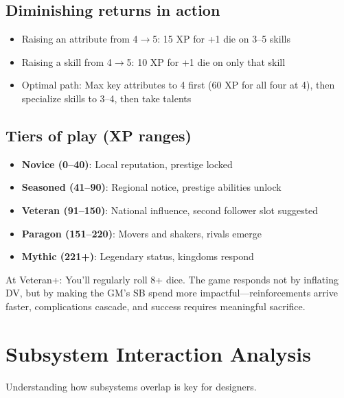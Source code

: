 \documentclass[11pt]{article}
\begin{document}
\subsection{Diminishing returns in action}
\begin{itemize}
    \item Raising an attribute from 4$\rightarrow$5: 15 XP for +1 die on 3--5 skills
    \item Raising a skill from 4$\rightarrow$5: 10 XP for +1 die on only that skill
    \item Optimal path: Max key attributes to 4 first (60 XP for all four at 4), then specialize skills to 3--4, then take talents
\end{itemize}

\subsection{Tiers of play (XP ranges)}
\begin{itemize}
    \item \textbf{Novice (0--40)}: Local reputation, prestige locked
    \item \textbf{Seasoned (41--90)}: Regional notice, prestige abilities unlock
    \item \textbf{Veteran (91--150)}: National influence, second follower slot suggested
    \item \textbf{Paragon (151--220)}: Movers and shakers, rivals emerge
    \item \textbf{Mythic (221+)}: Legendary status, kingdoms respond
\end{itemize}

At Veteran+: You'll regularly roll 8+ dice. The game responds not by inflating DV, but by making the GM's SB spend more impactful---reinforcements arrive faster, complications cascade, and success requires meaningful sacrifice.

\section{Subsystem Interaction Analysis}
\label{sec:subsystem-interaction}

Understanding how subsystems overlap is key for designers.
\end{document}
